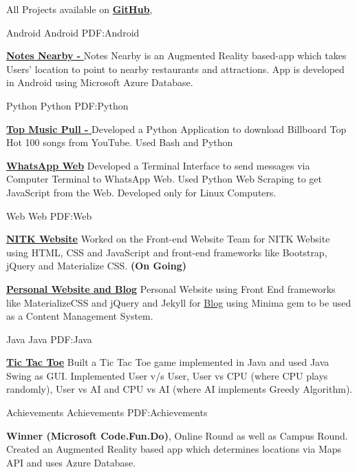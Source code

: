 \documentclass[letterpaper,MMMyyyy,nonstopmode]{simpleresumecv}
\begin{document}
\begin{Body}
\Entry
All Projects available on
\href{https://github.com/salman-bhai}
{\textbf{GitHub}},
\Gap

\SubSection
{Android}
{Android}
{PDF:Android}
\Gap

\BulletItem
\href{https://github.com/salman-bhai/NotesNearby}{\textbf{Notes Nearby - }}
Notes Nearby is an Augmented Reality based-app which takes Users' location to point to nearby restaurants and attractions. App is developed in Android using Microsoft Azure Database. 
\Gap

\SubSection
{Python}
{Python}
{PDF:Python}
\Gap

\BulletItem
\href{https://github.com/Hrily/TopMusicPull}{\textbf{Top Music Pull - }}
Developed a Python Application to download Billboard Top Hot 100 songs from YouTube. Used Bash and Python  
\Gap

\BulletItem
\href{https://github.com/salman-bhai/WhatsApp-Web}{\textbf{WhatsApp Web}}
Developed a Terminal Interface to send messages via Computer Terminal to WhatsApp Web. Used Python Web Scraping to get JavaScript from the Web. Developed only for Linux Computers.  
\Gap

\SubSection
{Web}
{Web}
{PDF:Web}
\Gap

\BulletItem
\href{https://github.com/salman-bhai/NITKWebsite}{\textbf{NITK Website}}
Worked on the Front-end Website Team for NITK Website using HTML, CSS and JavaScript and front-end frameworks like Bootstrap, jQuery and Materialize CSS. 
{\textbf{(On Going)}}
\Gap

\BulletItem
\href{https://github.com/salman-bhai/My-Website}{\textbf{Personal Website and Blog}}
Personal Website using Front End frameworks like MaterializeCSS and jQuery and Jekyll for 
\href{https://github.com/salman-bhai/Blog}{Blog} using Minima gem to be used as a Content Management System.
\Gap

\newpage

\SubSection
{Java}
{Java}
{PDF:Java}
\Gap

\BulletItem
\href{https://github.com/salman-bhai/TicTacToe}{\textbf{Tic Tac Toe}}
Built a Tic Tac Toe game implemented in Java and used Java Swing as GUI. 
Implemented User v/s User, User vs CPU (where CPU plays randomly), User vs AI and CPU vs AI (where AI implements Greedy Algorithm).
\Gap



\Section
{Achievements}
{Achievements}
{PDF:Achievements}

\BulletItem
{\textbf{Winner (Microsoft Code.Fun.Do)}},
Online Round as well as Campus Round.
Created an Augmented Reality based app which determines locations via Maps API
and uses Azure Database.
\Gap


\end{Body}
\end{document}
